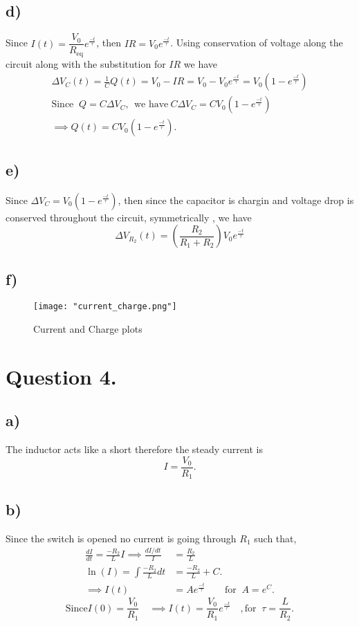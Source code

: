 \documentclass[
	12pt,
	]{article}
\theoremstyle{definition}
\theoremstyle{definition}
\theoremstyle{definition}
\theoremstyle{definition}
\theoremstyle{definition}
\theoremstyle{example}
\theoremstyle{note}
\theoremstyle{remark}
\theoremstyle{example}
\begin{document}
		\subsection*{d) }
			Since $I(t) = \dfrac{V_{0}}{R_{\text{eq}}} e^{\frac{-t}{\tau}}$, then $IR = V_{0}e^{\frac{-t}{\tau}}$. 
			Using conservation of voltage along the circuit along with the substitution for $IR$ we have
			\begin{align*}
				\Delta V_{C}(t) = \frac{1}{C}Q(t) = V_{0} - IR = V_{0} - V_{0}e^{\frac{-t}{\tau}} = V_{0}(1 - e^{\frac{-t}{\tau}}) \\
				\text{Since  } \ Q = C\Delta V_C ,  \ \ \text{we have} \ C\Delta V_C = C V_0(1-e^{\frac{-t}{\tau}})\\
				\implies Q(t) = CV_{0} (1-e^{\frac{-t}{\tau}}) .
			\end{align*}
		\subsection*{e) }
			Since $\Delta V_{C} =V_{0}(1-e^{\frac{-t}{\tau}})$, then since the capacitor is chargin and voltage drop is conserved throughout the circuit, symmetrically , we have 
			$$ \Delta V_{R_{2}}(t) = \left(\frac{R_{2}}{R_{1} + R_{2}}\right) V_{0} e^{\frac{-t}{\tau}}$$ 
			\newpage
		\subsection*{f) }
			\begin{figure}[h!]
				\centering
				\texttt{[image: "current\_charge.png"]}
				\caption{Current and Charge plots}
			\end{figure}
	\section*{Question 4. }
		\subsection*{a) }
			The inductor acts like a short therefore the steady current is 
			$$ I = \frac{V_{0}}{R_{1}}.$$
		\subsection*{b) }			
			Since the switch is opened no current is going through $R_1$ such that,
			\begin{align*}
				\frac{dI}{dt} = \frac{-R_{2}}{L}I \implies \frac{dI/dt}{I} &=\frac{R_{2}}{L}\\
				\ln(I) = \int \frac{-R_{2}}{L} dt &= \frac{-R_{2}}{L} +C.\\
				\implies I(t) &= Ae^{\frac{-t}{\tau}} \qquad \text{for } \ A = e^{C}.
			\end{align*} 
			\begin{equation*}
					\text{Since} I(0) = \frac{V_{0}}{R_{1}} \quad \implies I(t) = \frac{V_{0}}{R_{1}}e^{\frac{-t}{\tau}} \quad ,\text{for } \ \tau = \frac{L}{R_{2}}.
			\end{equation*}
\end{document}

